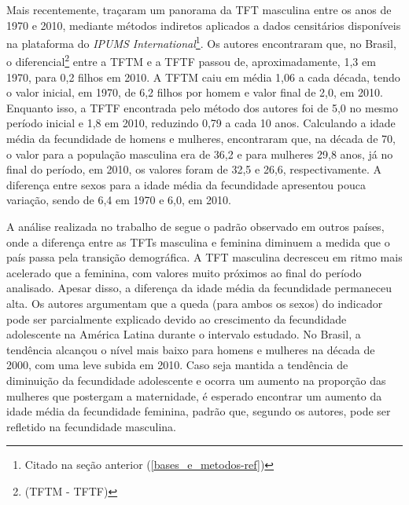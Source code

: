 Mais recentemente,  traçaram um panorama da TFT masculina entre os anos de 1970 e 2010, mediante métodos indiretos aplicados a dados censitários disponíveis na plataforma do \textit{IPUMS International}\footnote{Citado na seção anterior (\ref{bases_e_metodos-ref})}. Os autores encontraram que, no Brasil,
o diferencial\footnote{(TFTM - TFTF)} entre a TFTM e a TFTF passou de, aproximadamente, 1,3 em 1970, para 0,2 filhos em 2010. A TFTM caiu em média 1,06 a cada década, tendo o valor inicial, em 1970, de 6,2 filhos por homem e valor final de 2,0, em 2010. Enquanto isso, a TFTF encontrada pelo método dos autores foi de 5,0 no mesmo período inicial e 1,8 em 2010, reduzindo 0,79 a cada 10 anos. Calculando a idade média da fecundidade de homens e mulheres, encontraram que, na década de 70, o valor para a população masculina era de 36,2 e para mulheres 29,8 anos, já no final do período, em 2010, os valores foram de 32,5 e 26,6, respectivamente. A diferença entre sexos para a idade média da fecundidade apresentou pouca variação, sendo de 6,4 em 1970 e 6,0, em 2010.

A análise realizada no trabalho de  segue o padrão observado em outros países, onde a diferença entre as TFTs masculina e feminina diminuem a medida que o país passa pela transição demográfica. A TFT masculina decresceu em ritmo mais acelerado que a feminina, com valores muito próximos ao final do período analisado. Apesar disso, a diferença da idade média da fecundidade permaneceu alta. Os autores argumentam que a queda (para ambos os sexos) do indicador pode ser parcialmente explicado devido ao crescimento da fecundidade adolescente na América Latina durante o intervalo estudado. No Brasil, a tendência alcançou o nível mais baixo para homens e mulheres na década de 2000, com uma leve subida em 2010. Caso seja mantida a tendência de diminuição da fecundidade adolescente e ocorra um aumento na proporção das mulheres que postergam a maternidade, é esperado encontrar um aumento da idade média da fecundidade feminina, padrão que, segundo os autores, pode ser refletido na fecundidade masculina. 

